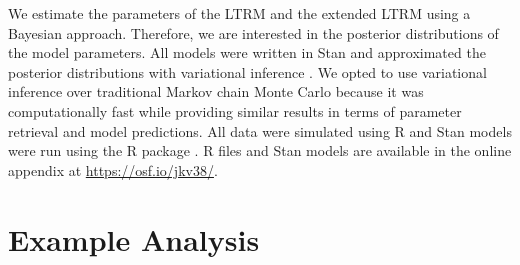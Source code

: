 \documentclass[a4paper,usenames,dvipsnames]{article}
\newcommand{\osflink}{\url{https://osf.io/jkv38/}}
\begin{document}
We estimate the parameters of the LTRM and the extended LTRM using a Bayesian approach. Therefore, we are interested in the posterior distributions of the model parameters. All models were written in Stan and approximated the posterior distributions with variational inference \cite{CarpenterEtAl2017Stan}. We opted to use variational inference over traditional Markov chain Monte Carlo because it was computationally fast while providing similar results in terms of parameter retrieval and model predictions. All data were simulated using R \cite{R} and Stan models were run using the R package  \cite{rstan2019a2192}. R files and Stan models are available in the online appendix at \osflink{}.

\section*{Example Analysis}
\end{document}
